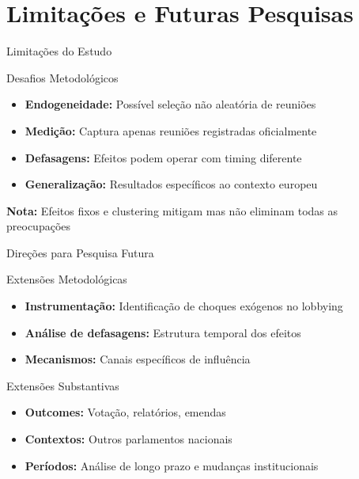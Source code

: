 \documentclass[aspectratio=169]{beamer}
\begin{document}

\section{Limitações e Futuras Pesquisas}

\begin{frame}{Limitações do Estudo}
\begin{block}{Desafios Metodológicos}
\begin{itemize}
\item \textbf{Endogeneidade:} Possível seleção não aleatória de reuniões
\item \textbf{Medição:} Captura apenas reuniões registradas oficialmente
\item \textbf{Defasagens:} Efeitos podem operar com timing diferente
\item \textbf{Generalização:} Resultados específicos ao contexto europeu
\end{itemize}
\end{block}

\vspace{0.3cm}

\textbf{Nota:} Efeitos fixos e clustering mitigam mas não eliminam todas as preocupações
\end{frame}

\begin{frame}{Direções para Pesquisa Futura}
\begin{block}{Extensões Metodológicas}
\begin{itemize}
\item \textbf{Instrumentação:} Identificação de choques exógenos no lobbying
\item \textbf{Análise de defasagens:} Estrutura temporal dos efeitos
\item \textbf{Mecanismos:} Canais específicos de influência
\end{itemize}
\end{block}

\begin{block}{Extensões Substantivas}
\begin{itemize}
\item \textbf{Outcomes:} Votação, relatórios, emendas
\item \textbf{Contextos:} Outros parlamentos nacionais
\item \textbf{Períodos:} Análise de longo prazo e mudanças institucionais
\end{itemize}
\end{block}
\end{frame}
\end{document}
